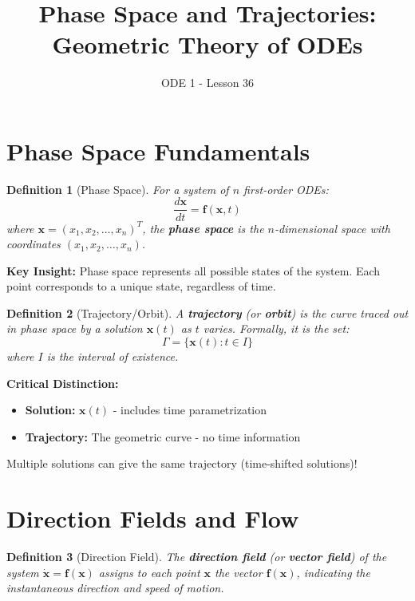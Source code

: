 \documentclass[12pt]{article}
\title{Phase Space and Trajectories: Geometric Theory of ODEs}
\author{ODE 1 - Lesson 36}
\date{}
\newtheorem{definition}{Definition}
\begin{document}
\maketitle

\section{Phase Space Fundamentals}

\begin{definition}[Phase Space]
For a system of $n$ first-order ODEs:
$$\frac{d\mathbf{x}}{dt} = \mathbf{f}(\mathbf{x}, t)$$
where $\mathbf{x} = (x_1, x_2, \ldots, x_n)^T$, the \textbf{phase space} is the $n$-dimensional space with coordinates $(x_1, x_2, \ldots, x_n)$.
\end{definition}

\begin{keypoint}
\textbf{Key Insight:} Phase space represents all possible states of the system. Each point corresponds to a unique state, regardless of time.
\end{keypoint}

\begin{definition}[Trajectory/Orbit]
A \textbf{trajectory} (or \textbf{orbit}) is the curve traced out in phase space by a solution $\mathbf{x}(t)$ as $t$ varies. Formally, it is the set:
$$\Gamma = \{\mathbf{x}(t) : t \in I\}$$
where $I$ is the interval of existence.
\end{definition}

\begin{warning}
\textbf{Critical Distinction:}
\begin{itemize}
    \item \textbf{Solution:} $\mathbf{x}(t)$ - includes time parametrization
    \item \textbf{Trajectory:} The geometric curve - no time information
\end{itemize}
Multiple solutions can give the same trajectory (time-shifted solutions)!
\end{warning}

\section{Direction Fields and Flow}

\begin{definition}[Direction Field]
The \textbf{direction field} (or \textbf{vector field}) of the system $\dot{\mathbf{x}} = \mathbf{f}(\mathbf{x})$ assigns to each point $\mathbf{x}$ the vector $\mathbf{f}(\mathbf{x})$, indicating the instantaneous direction and speed of motion.
\end{definition}
\end{document}
